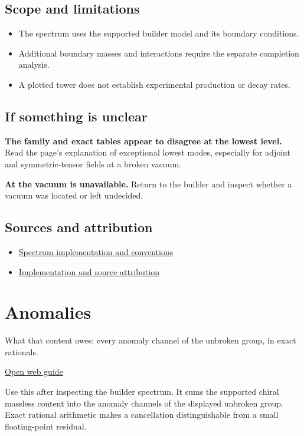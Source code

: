 \documentclass[11pt,a4paper]{article}
\begin{document}
\subsection*{Scope and limitations}
\begin{itemize}
\item The spectrum uses the supported builder model and its boundary conditions.
\item Additional boundary masses and interactions require the separate completion analysis.
\item A plotted tower does not establish experimental production or decay rates.
\end{itemize}
\subsection*{If something is unclear}
\textbf{The family and exact tables appear to disagree at the lowest level.} Read the page's explanation of exceptional lowest modes, especially for adjoint and symmetric-tensor fields at a broken vacuum.

\textbf{At the vacuum is unavailable.} Return to the builder and inspect whether a vacuum was located or left undecided.

\subsection*{Sources and attribution}
\begin{itemize}
\item \href{https://github.com/karlesmarin/ghu-lab/blob/main/src/modules/spectrum5d.mjs}{Spectrum implementation and conventions}
\item \href{https://github.com/karlesmarin/ghu-lab/blob/main/src/sections/spectrum5d_section.js}{Implementation and source attribution}
\end{itemize}
\section{Anomalies}
What that content owes: every anomaly channel of the unbroken group, in exact rationals.

\href{https://karlesmarin.github.io/ghu-explorer/guide/anomaly5d/index.html}{Open web guide}

Use this after inspecting the builder spectrum. It sums the supported chiral massless content into the anomaly channels of the displayed unbroken group. Exact rational arithmetic makes a cancellation distinguishable from a small floating-point residual.
\end{document}
